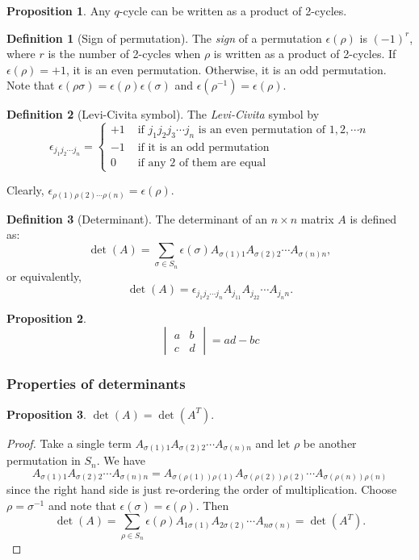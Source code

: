 \documentclass[a4paper]{article}
\theoremstyle{definition}
\newtheorem*{prop}{Proposition}
\newtheorem*{defi}{Definition}
\begin{document}
\begin{prop}
  Any $q$-cycle can be written as a product of 2-cycles.
\end{prop}

\begin{defi}[Sign of permutation]
  The \emph{sign} of a permutation $\epsilon(\rho)$ is $(-1)^r$, where $r$ is the number of 2-cycles when $\rho$ is written as a product of 2-cycles. If $\epsilon(\rho) = +1$, it is an even permutation. Otherwise, it is an odd permutation. Note that $\epsilon(\rho\sigma) = \epsilon(\rho)\epsilon(\sigma)$ and $\epsilon(\rho^{-1}) = \epsilon(\rho)$.
\end{defi}

\begin{defi}[Levi-Civita symbol]
  The \emph{Levi-Civita} symbol by
\[
\epsilon_{j_1j_2\cdots j_n} = \begin{cases}+1 & \text{ if } j_1j_2j_3\cdots j_n\text{ is an even permutation of }1, 2, \cdots n\\
    -1 & \text{ if it is an odd permutation}\\
    0 & \text{ if any 2 of them are equal}
  \end{cases}
\]

Clearly, $\epsilon_{\rho(1)\rho(2)\cdots \rho(n)} = \epsilon(\rho)$.
\end{defi}

\begin{defi}[Determinant]
  The determinant of an $n\times n$ matrix $A$ is defined as:
\[
\det (A) = \sum_{\sigma\in S_n} \epsilon(\sigma) A_{\sigma(1)1}A_{\sigma(2)2}\cdots A_{\sigma(n)n},
\]
or equivalently,
\[
\det(A) = \epsilon_{j_1j_2\cdots j_n}A_{j_11}A_{j_22}\cdots A_{j_nn}.
\]
\end{defi}

\begin{prop}
  \[
  \begin{vmatrix}
    a & b\\
    c & d
  \end{vmatrix} = ad - bc
  \]
\end{prop}

\subsubsection{Properties of determinants}
\begin{prop}
  $\det (A) = \det (A^T)$.
\end{prop}

\begin{proof}
  Take a single term $A_{\sigma(1)1}A_{\sigma(2)2}\cdots A_{\sigma(n)n}$ and let $\rho$ be another permutation in $S_n$. We have
  \[
  A_{\sigma(1)1}A_{\sigma(2)2}\cdots A_{\sigma(n)n} = A_{\sigma(\rho(1))\rho(1)}A_{\sigma(\rho(2))\rho(2)}\cdots A_{\sigma(\rho(n))\rho(n)}
  \]
  since the right hand side is just re-ordering the order of multiplication. Choose $\rho = \sigma^{-1}$ and note that $\epsilon(\sigma) = \epsilon(\rho)$. Then
  \[
  \det(A) = \sum_{\rho\in S_n} \epsilon(\rho) A_{1\sigma(1)}A_{2\sigma(2)}\cdots A_{n\sigma(n)} = \det (A^T).
  \]
\end{proof}
\end{document}
